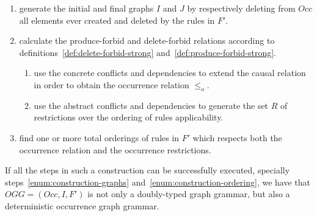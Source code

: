 \begin{definition}
\begin{enumerate}
\item\label{enum:construction-graphs} generate the initial and final graphs $I$ and $J$ by respectively deleting from $Occ$ all elements ever created and deleted by the rules in $F'$.

\item\label{enum:construction-occurrence} calculate the produce-forbid and delete-forbid relations according to definitions~\ref{def:delete-forbid-strong} and~\ref{def:produce-forbid-strong}.

\begin{enumerate}
\item\label{enum:construction-analysis} use the concrete conflicts and dependencies to extend the causal relation in order to obtain the occurrence relation $\leq_o$.

\item\label{enum:construction-restriction} use the abstract conflicts and dependencies to generate the set $R$ of restrictions over the ordering of rules applicability.
\end{enumerate}

\item\label{enum:construction-ordering} find one or more total orderings of rules in $F'$ which respects both the occurrence relation and the occurrence restrictions.
\end{enumerate}

\end{definition}

If all the steps in such a construction can be successfully executed, specially steps~\ref{enum:construction-graphs} and~\ref{enum:construction-ordering}, we have that $OGG = (Occ, I, F')$ is not only a doubly-typed graph grammar, but also a deterministic occurrence graph grammar. %

